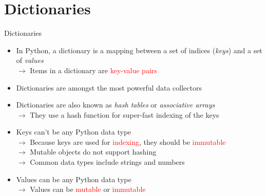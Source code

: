 \documentclass[t,handout,9pt]{beamer}
\begin{document}
\section{Dictionaries}
\begin{frame}{Dictionaries}
\vfill
\begin{itemize}
	\item In Python, a dictionary is a mapping between a set of indices (\textit{keys}) and a set of \textit{values}\\
		\qquad $\rightarrow$ Items in a dictionary are \textcolor{red}{key-value pairs}
	\item Dictionaries are amongst the most powerful data collectors
	\item Dictionaries are also known as \textit{hash tables} or \textit{associative arrays}\\
		\qquad $\rightarrow$ They use a hash function for super-fast indexing of the keys
	\item Keys can't be any Python data type\\
		\qquad $\rightarrow$ Because keys are used for \textcolor{red}{indexing}, they should be \textcolor{red}{immutable}\\
		\qquad $\rightarrow$ Mutable objects do not support hashing\\
		\qquad $\rightarrow$ Common data types include strings and numbers
	\item Values can be any Python data type\\
		\qquad $\rightarrow$ Values can be \textcolor{red}{mutable} or \textcolor{red}{immutable}
\end{itemize}
\vfill
\end{frame}
%
\end{document}
